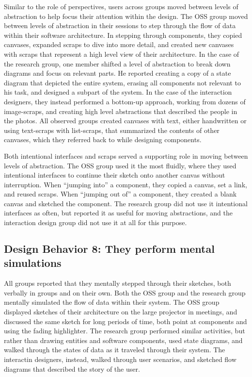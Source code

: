 Similar to the role of perspectives, users across groups moved between levels of abstraction to help focus their attention within the design. The OSS group moved between levels of abstraction in their sessions to step through the flow of data within their software architecture. In stepping through components, they copied canvases, expanded scraps to dive into more detail, and created new canvases with scraps that represent a high level view of their architecture. In the case of the research group, one member shifted a level of abstraction to break down diagrams and focus on relevant parts. He reported creating a copy of a state diagram that depicted the entire system, erasing all components not relevant to his task, and designed a subpart of the system. In the case of the interaction designers, they instead performed a bottom-up approach, working from dozens of image-scraps, and creating high level abstractions that described the people in the photos. All observed groups created canvases with text, either handwritten or using text-scraps with list-scraps, that summarized the contents of other canvases, which they referred back to while designing components. 

Both intentional interfaces and scraps served a supporting role in moving between levels of abstraction. The OSS group used it the most fluidly, where they used intentional interfaces to continue their sketch onto another canvas without interruption. When ``jumping into'' a component, they copied a canvas, set a link, and reused scraps. When ``jumping out of'' a component, they created a blank canvas and sketched the component. The research group did not use it intentional interfaces as often, but reported it as useful for moving abstractions, and the interaction design group did not use it at all for this purpose.



\subsection{Design Behavior 8: They perform mental simulations}

All groups reported that they mentally stepped through their sketches, both verbally in groups and on their own. Both the OSS group and the research group mentally simulated the flow of data within their system. The OSS group displayed sketches of their architecture on the large projector in meetings, and discussed the same sketch for long periods of time, both point at components and using the fading highlighter. The research group performed similar activities, but rather than drawing entities and software components, used state diagrams, and walked through the states of data as it traveled through their system. The interactin designers, instead, walked through user scenarios, and sketched flow diagrams that described the story of the user.

